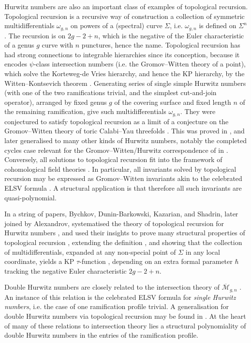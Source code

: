 \documentclass[10pt,a4paper,oneside,no-math,reqno]{amsart}%
\theoremstyle{plain}
\theoremstyle{definition}
\theoremstyle{remark}
\numberwithin{equation}{section}
\newcommand{\1}{\mathds{1}}
\newcommand{\<}{\langle}
\renewcommand{\>}{\rangle}
\begin{document}
Hurwitz numbers are also an important class of examples of topological recursion. Topological recursion \cite{EO07} is a recursive way of construction a collection of symmetric multidifferentials $ \omega_{g,n}$ on powers of a (spectral) curve $ \Sigma$, i.e. $ \omega_{g,n}$ is defined on $ \Sigma^n$. The recursion is on $ 2g -2 + n$, which is the negative of the Euler characteristic of a genus $g $ curve with $n$ punctures, hence the name. Topological recursion has had strong connections to integrable hierarchies since its conception, because it encodes $\psi$-class intersection numbers (i.e. the Gromov--Witten theory of a point), which solve the Korteweg-de Vries hierarchy, and hence the KP hierarchy, by the Witten--Kontsevich theorem \cite{Wit91,Kon92}. Generating series of single simple Hurwitz numbers (with one of the two ramifications trivial, and the simplest cut-and-join operator), arranged by fixed genus $g$ of the covering surface and fixed length $n$ of the remaining ramification, give such multidifferentials $ \omega_{g,n}$. They were conjectured to satisfy topological recursion \cite{BM08} as a limit of a conjecture on the Gromov--Witten theory of toric Calabi--Yau threefolds \cite{BKMP09}. This was proved in \cite{EMS11}, and later generalised to many other kinds of Hurwitz numbers, notably the completed cycles case relevant for the Gromov--Witten/Hurwitz correspondence of \cite{OP06,OP06a} in \cite{DKPS23}. Conversely, all solutions to topological recursion fit into the framework of cohomological field theories \cite{Eyn14}.  In particular, all invariants solved by topological recursion may be expressed as Gromov--Witten invariants akin to the celebrated ELSV formula \cite{ELSV01}. A structural application is that therefore all such invariants are quasi-polynomial.


In a string of papers, Bychkov, Dunin-Barkowski, Kazarian, and Shadrin, later joined by Alexandrov, systematised the theory of topological recursion for Hurwitz numbers \cite{BDKS22,BDKS24}, and used their insights to prove many structural properties of topological recursion \cite{BDKS23,BDKS25,ABDKS24,ABDKS24a,ABDKS25universal}, extending the definition \cite{ABDKS25}, and showing that the collection of multidifferentials, expanded at any non-special point of $\Sigma$ in any local coordinate, yields a KP $\tau$-function \cite{ABDKS24KP0,ABDKS24KP+,ABDKS25blobbed}, depending on an extra formal parameter $ \hbar$ tracking the negative Euler characteristic $ 2g-2+n$.

Double Hurwitz numbers are closely related to the intersection theory of $\overline{\mathcal{M}}_{g,n}$ \cite{GV05,GJV05}. An instance of this relation is the celebrated ELSV formula  \cite{ELSV01} for \emph{single Hurwitz numbers}, i.e. the case of one ramification profile trivial. A generalisation for double Hurwitz numbers via topological recursion may be found in \cite{BDKLM20}. At the heart of many of these relations to intersection theory lies a structural polynomiality of double Hurwitz numbers in the entries of the ramification profile.
\end{document}
